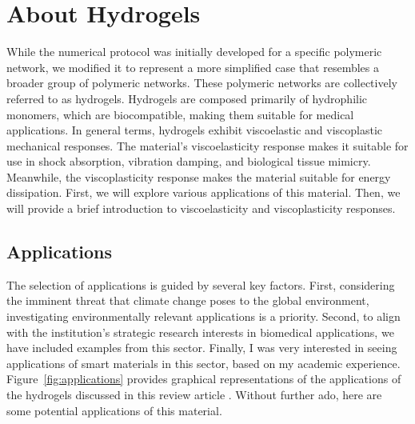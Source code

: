 \section{About Hydrogels}

While the numerical protocol was initially developed for a specific polymeric network, we modified it to represent a more simplified case that resembles a broader group of polymeric networks.
These polymeric networks are collectively referred to as hydrogels.
Hydrogels are composed primarily of hydrophilic monomers, which are biocompatible, making them suitable for medical applications.
In general terms, hydrogels exhibit viscoelastic and viscoplastic mechanical responses.
The material's viscoelasticity response makes it suitable for use in shock absorption, vibration damping, and biological tissue mimicry.
Meanwhile, the viscoplasticity response makes the material suitable for energy dissipation.
First, we will explore various applications of this material.
Then, we will provide a brief introduction to viscoelasticity and viscoplasticity responses.

\subsection{Applications}

The selection of applications is guided by several key factors. 
First, considering the imminent threat that climate change poses to the global environment, investigating environmentally relevant applications is a priority.
Second, to align with the institution's strategic research interests in biomedical applications, we have included examples from this sector.
Finally, I was very interested in seeing applications of smart materials in this sector, based on my academic experience.
Figure~\ref{fig:applications} provides graphical representations of the applications of the hydrogels discussed in this review article \citep{petelinsekToughHydrogelsLoadBearing2024}.
Without further ado, here are some potential applications of this material.

